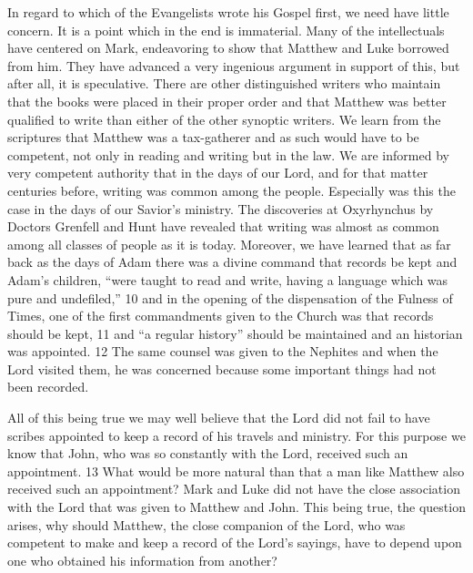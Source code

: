 In regard to which of the Evangelists wrote his Gospel first, we need have little concern. It is
a point which in the end is immaterial. Many of the intellectuals have centered on Mark,
endeavoring to show that Matthew and Luke borrowed from him. They have advanced a very
ingenious argument in support of this, but after all, it is speculative. There are other
distinguished writers who maintain that the books were placed in their proper order and that
Matthew was better qualified to write than either of the other synoptic writers. We learn from
the scriptures that Matthew was a tax-gatherer and as such would have to be competent, not
only in reading and writing but in the law. We are informed by very competent authority that
in the days of our Lord, and for that matter centuries before, writing was common among the
people. Especially was this the case in the days of our Savior's ministry. The discoveries at
Oxyrhynchus by Doctors Grenfell and Hunt have revealed that writing was almost as
common among all classes of people as it is today. Moreover, we have learned that as far
back as the days of Adam there was a divine command that records be kept and Adam's
children, ``were taught to read and write, having a language which was pure and undefiled,''
10 and in the opening of the dispensation of the Fulness of Times, one of the first
commandments given to the Church was that records should be kept, 11 and ``a regular
history'' should be maintained and an historian was appointed. 12 The same counsel was
given to the Nephites and when the Lord visited them, he was concerned because some
important things had not been recorded.

All of this being true we may well believe that the Lord did not fail to have scribes appointed
to keep a record of his travels and ministry. For this purpose we know that John, who was so
constantly with the Lord, received such an appointment. 13 What would be more natural than
that a man like Matthew also received such an appointment? Mark and Luke did not have the
close association with the Lord that was given to Matthew and John. This being true, the
question arises, why should Matthew, the close companion of the Lord, who was competent
to make and keep a record of the Lord's sayings, have to depend upon one who obtained his
information from another?

